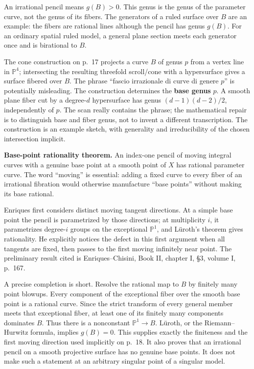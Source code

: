 An irrational pencil means \(g(B)>0\). This genus is the genus of the parameter curve, not the genus of its fibers. The generators of a ruled surface over \(B\) are an example: the fibers are rational lines although the pencil has genus \(g(B)\). For an ordinary spatial ruled model, a general plane section meets each generator once and is birational to \(B\).

The cone construction on p.~17 projects a curve \(B\) of genus \(p\) from a vertex line in \(\mathbb P^4\); intersecting the resulting threefold scroll/cone with a hypersurface gives a surface fibered over \(B\). The phrase ``fascio irrazionale di curve di genere \(p\)'' is potentially misleading. The construction determines the \textbf{base genus} \(p\). A smooth plane fiber cut by a degree-\(d\) hypersurface has genus \((d-1)(d-2)/2\), independently of \(p\). The scan really contains the phrase; the mathematical repair is to distinguish base and fiber genus, not to invent a different transcription. The construction is an example sketch, with generality and irreducibility of the chosen intersection implicit.

\textbf{Base-point rationality theorem.} An index-one pencil of moving integral curves with a genuine base point at a smooth point of \(X\) has rational parameter curve. The word ``moving'' is essential: adding a fixed curve to every fiber of an irrational fibration would otherwise manufacture ``base points'' without making its base rational.

Enriques first considers distinct moving tangent directions. At a simple base point the pencil is parametrized by those directions; at multiplicity \(i\), it parametrizes degree-\(i\) groups on the exceptional \(\mathbb P^1\), and Lüroth's theorem gives rationality. He explicitly notices the defect in this first argument when all tangents are fixed, then passes to the first moving infinitely near point. The preliminary result cited is Enriques--Chisini, Book II, chapter I, §3, volume I, p.~167.

A precise completion is short. Resolve the rational map to \(B\) by finitely many point blowups. Every component of the exceptional fiber over the smooth base point is a rational curve. Since the strict transform of every general member meets that exceptional fiber, at least one of its finitely many components dominates \(B\). Thus there is a nonconstant \(\mathbb P^1\to B\). Lüroth, or the Riemann--Hurwitz formula, implies \(g(B)=0\). This supplies exactly the finiteness and the first moving direction used implicitly on p.~18. It also proves that an irrational pencil on a smooth projective surface has no genuine base points. It does not make such a statement at an arbitrary singular point of a singular model.

